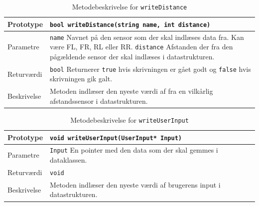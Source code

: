 \begin{table}[h]
\begin{tabularx}{\textwidth}{| L{2.5 cm} | Z |} \hline
Prototype & \texttt{bool  writeDistance(string name, int distance)} \\\hline
Parametre & \texttt{name} \newline Navnet på den sensor som der skal indlæses data fra. Kan være FL, FR, RL eller RR. \newline \newline
			\texttt{distance} \newline
			Afstanden der fra den pågældende sensor der skal indlæses i datastrukturen.\\\hline
Returværdi &  \texttt{bool} \newline Returnerer \texttt{true} hvis skrivningen er gået godt og \texttt{false} hvis skrivningen gik galt. \\\hline
Beskrivelse & Metoden indlæser den nyeste værdi af fra en vilkårlig afstandssensor i datastrukturen. \\\hline
\end{tabularx}
\caption{Metodebeskrivelse for \texttt{writeDistance}}
\label{table:met_writeDistance}
\end{table}

\begin{table}[h]
\begin{tabularx}{\textwidth}{| L{2.5 cm} | Z |} \hline
Prototype & \texttt{void writeUserInput(UserInput* Input)} \\\hline
Parametre & \texttt{Input} \newline En pointer med den data som der skal gemmes i dataklassen. \\\hline
Returværdi &  \texttt{void} \newline \\\hline
Beskrivelse & Metoden indlæser den nyeste værdi af brugerens input i datastrukturen. \\\hline
\end{tabularx}
\caption{Metodebeskrivelse for \texttt{writeUserInput}}
\label{table:met_writeUserInput}
\end{table}

